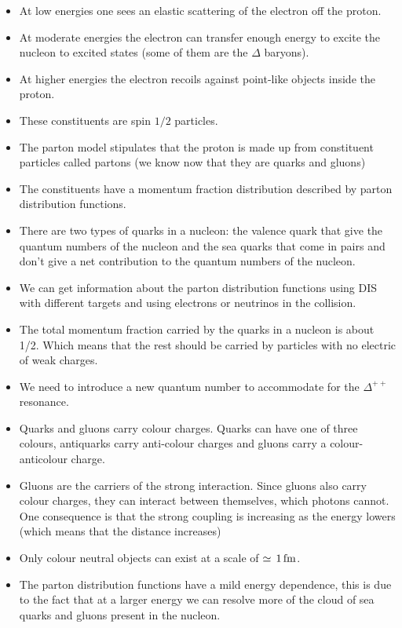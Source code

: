 \documentclass[12pt]{article}
\begin{document}
\begin{itemize}
\item At low energies one sees an elastic scattering of the electron off the proton.
\item At moderate energies the electron can transfer enough energy to excite the nucleon to excited states (some of them are the $\Delta$ baryons).
\item At higher energies the electron recoils against point-like objects inside the proton.
\item These constituents are spin $1/2$ particles.
  \item The parton model stipulates that the proton is made up from constituent particles called partons (we know now that they are quarks and gluons) 
  \item The constituents have a momentum fraction distribution described by parton distribution functions.
    \item There are two types of quarks in a nucleon: the valence quark that give the quantum numbers of the nucleon and the sea quarks that come in pairs and don't give a net contribution to the quantum numbers of the nucleon.
  \item We can get information about the parton distribution functions using DIS with different targets and using electrons or neutrinos in the collision.
  \item The total momentum fraction carried by the quarks in a nucleon is about 1/2. Which means that the rest should be carried by particles with no electric of weak charges.
  \item We need to introduce a new quantum number to accommodate for the $\Delta^{++}$ resonance.
  \item Quarks and gluons carry colour charges. Quarks can have one of three colours, antiquarks carry anti-colour charges and gluons carry a colour-anticolour charge.
  \item Gluons are the carriers of the strong interaction. Since gluons also carry colour charges, they can interact between themselves, which photons cannot. One consequence is that the strong coupling is increasing as the energy lowers (which means that the distance increases)
  \item Only colour neutral objects can exist at a scale of $\simeq \, 1\,\rm{fm}$.
    \item The parton distribution functions have a mild energy dependence, this is due to the fact that at a larger energy we can resolve more of the cloud of sea quarks and gluons present in the nucleon.
\end{itemize}
\end{document}
